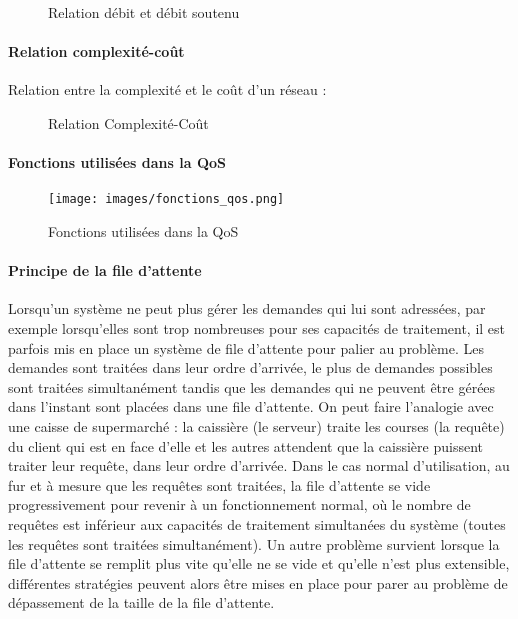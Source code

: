 \documentclass[french]{article}
\begin{document}
\begin{figure}[h]
	\caption{Relation débit et débit soutenu}
	\label{fig:relation_debit_instantane_vs_soutenu}
\end{figure} 

\paragraph{Relation complexité-coût}

Relation entre la complexité et le coût d'un réseau :

\begin{figure}[h]
	\caption{Relation Complexité-Coût}
	\label{fig:relation_complexite_cout}
\end{figure} 

\paragraph{Fonctions utilisées dans la QoS}

\begin{figure}[h]
	\texttt{[image: images/fonctions\_qos.png]}
	\caption{Fonctions utilisées dans la QoS}
	\label{fig:fonctions_qos}
\end{figure} 

\paragraph{Principe de la file d'attente}

Lorsqu'un système ne peut plus gérer les demandes qui lui sont adressées, par exemple lorsqu'elles sont trop nombreuses pour ses capacités de traitement, il est parfois mis en place un système de file d'attente pour palier au problème.
Les demandes sont traitées dans leur ordre d'arrivée, le plus de demandes possibles sont traitées simultanément tandis que les demandes qui ne peuvent être gérées dans l'instant sont placées dans une file d'attente. On peut faire l'analogie avec une caisse de supermarché : la caissière (le serveur) traite les courses (la requête) du client qui est en face d'elle et les autres attendent que la caissière puissent traiter leur requête, dans leur ordre d'arrivée.
Dans le cas normal d'utilisation, au fur et à mesure que les requêtes sont traitées, la file d'attente se vide progressivement pour revenir à un fonctionnement normal, où le nombre de requêtes est inférieur aux capacités de traitement simultanées du système (toutes les requêtes sont traitées simultanément).
Un autre problème survient lorsque la file d'attente se remplit plus vite qu'elle ne se vide et qu'elle n'est plus extensible, différentes stratégies peuvent alors être mises en place pour parer au problème de dépassement de la taille de la file d'attente.
\end{document}
